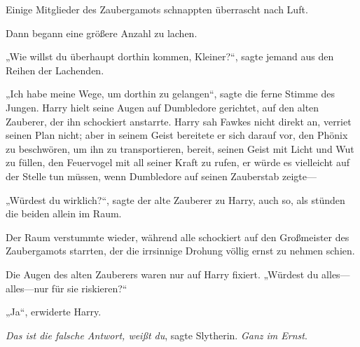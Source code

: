 Einige Mitglieder des Zaubergamots schnappten überrascht nach Luft.

Dann begann eine größere Anzahl zu lachen.

„Wie willst du überhaupt dorthin kommen, Kleiner?“, sagte jemand aus den Reihen der Lachenden.

„Ich habe meine Wege, um dorthin zu gelangen“, sagte die ferne Stimme des Jungen. Harry hielt seine Augen auf Dumbledore gerichtet, auf den alten Zauberer, der ihn schockiert anstarrte. Harry sah Fawkes nicht direkt an, verriet seinen Plan nicht; aber in seinem Geist bereitete er sich darauf vor, den Phönix zu beschwören, um ihn zu transportieren, bereit, seinen Geist mit Licht und Wut zu füllen, den Feuervogel mit all seiner Kraft zu rufen, er würde es vielleicht auf der Stelle tun müssen, wenn Dumbledore auf seinen Zauberstab zeigte—

„Würdest du wirklich?“, sagte der alte Zauberer zu Harry, auch so, als stünden die beiden allein im Raum.

Der Raum verstummte wieder, während alle schockiert auf den Großmeister des Zaubergamots starrten, der die irrsinnige Drohung völlig ernst zu nehmen schien.

Die Augen des alten Zauberers waren nur auf Harry fixiert.
„Würdest du alles—alles—nur für sie riskieren?“

„Ja“, erwiderte Harry.

\emph{Das ist die falsche Antwort, weißt du}, sagte Slytherin. \emph{Ganz im Ernst}.

